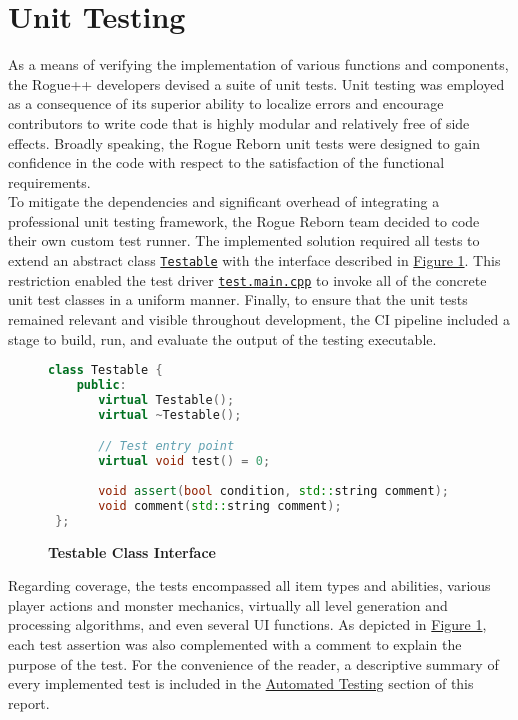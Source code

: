 \documentclass[12pt, titlepage]{article}
\newcommand{\newsection}[1]{\newpage\section{#1}}
\begin{document}
\newsection{Unit Testing} \label{Section_UT}
	As a means of verifying the implementation of various functions and components, the Rogue++ developers devised a suite of unit tests.  Unit testing was employed as a consequence of its superior ability to localize errors and encourage contributors to write code that is highly modular and relatively free of side effects.  Broadly speaking, the Rogue Reborn unit tests were designed to gain confidence in the code with respect to the satisfaction of the functional requirements.\\

	To mitigate the dependencies and significant overhead of integrating a professional unit testing framework, the Rogue Reborn team decided to code their own custom test runner.  The implemented solution required all tests to extend an abstract class \href{run:../../src/test.testable.h}{\lstinline$Testable$} with the interface described in \hyperref[Figure_Testable]{Figure 1}.  This restriction enabled the test driver \href{run:../../src/test.main.cpp}{\lstinline$test.main.cpp$} to invoke all of the concrete unit test classes in a uniform manner.  Finally, to ensure that the unit tests remained relevant and visible throughout development, the CI pipeline included a stage to build, run, and evaluate the output of the testing executable.

	\begin{figure}[H] \label{Figure_Testable}
		\caption{\bf Testable Class Interface}
		\centering
		\begin{lstlisting}[language=C++]
 class Testable {
    public:
       virtual Testable();
       virtual ~Testable();

       // Test entry point
       virtual void test() = 0;
            
       void assert(bool condition, std::string comment);
       void comment(std::string comment);
 };
		\end{lstlisting}
	\end{figure} 

	Regarding coverage, the tests encompassed all item types and abilities, various player actions and monster mechanics, virtually all level generation and processing algorithms, and even several UI functions.  As depicted in \hyperref[Figure_Testable]{Figure 1}, each test assertion was also complemented with a comment to explain the purpose of the test.  For the convenience of the reader, a descriptive summary of every implemented test is included in the \hyperref[Section_Automated]{Automated Testing} section of this report.\\
\end{document}

